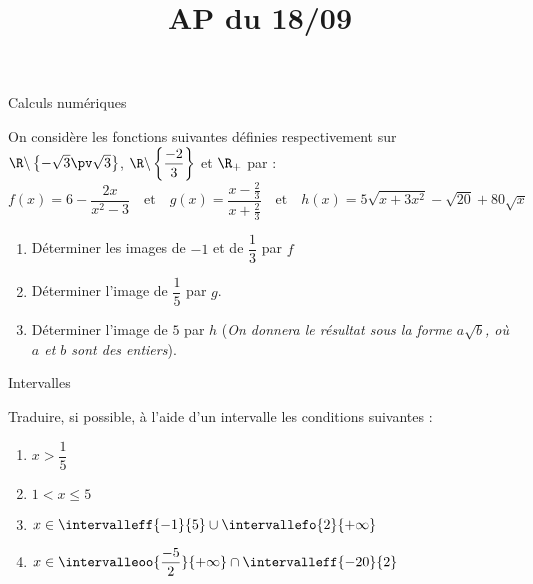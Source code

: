 \documentclass[%
french,onlymath]{beamer}
\title{AP du 18/09}
\author{\seconde}\institute{Lycée Robert Doisneau}
\date{}
\begin{document}



\begin{frame}
 \titlepage
\end{frame}
\begin{frame}{Calculs numériques}

On considère les fonctions suivantes définies respectivement sur $\R\backslash\left\{-\sqrt{3}\pv \sqrt{3}\right\}$,  $\R\backslash\left\{\dfrac{-2}{3}\right\}$ et   $\R_+$ par :
\[f(x)=6-\frac{2x}{x^2-3}\quad\text{et}\quad g(x)=\frac{x-\frac{2}{3}}{x+\frac{2}{3}}\quad\text{et}\quad h(x)=5\sqrt{x+3x^2}-\sqrt{20}+80\sqrt{x}\]

\begin{enumerate}[\bf 1.]

\item Déterminer les images de $-1$ et de $\dfrac{1}{3}$ par $f$

\item Déterminer l'image de $\dfrac{1}{5}$ par $g$.

\item Déterminer l'image de $5$ par $h$ (\textit{On donnera le résultat sous la forme $a\sqrt{b}$, où $a$ et $b$ sont des entiers}).

\end{enumerate}
\end{frame}
\begin{frame}{Intervalles}

Traduire, si possible, à l'aide d'un intervalle les conditions suivantes :

\begin{enumerate}[\bf 1.]
\item $x>\dfrac{1}{5}$

\item $1<x\leq 5$

\item $x\in \intervalleff{-1}{5}\cup\intervallefo{2}{+\infty}$

\item $x\in \intervalleoo{\dfrac{-5}{2}}{+\infty}\cap \intervalleff{-20}{2}$

\end{enumerate}



\end{frame}
\end{document}
